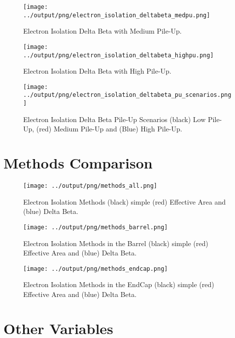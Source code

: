 \documentclass[11pt]{book}
\begin{document}
\begin{figure}[htbp]
\centering
\texttt{[image: ../output/png/electron\_isolation\_deltabeta\_medpu.png]}
\caption{Electron Isolation Delta Beta with Medium Pile-Up.}
\label{fig:electron_isolation_deltabeta_medpu}
\end{figure}

\begin{figure}[htbp]
\centering
\texttt{[image: ../output/png/electron\_isolation\_deltabeta\_highpu.png]}
\caption{Electron Isolation Delta Beta with High Pile-Up.}
\label{fig:electron_isolation_deltabeta_highpu}
\end{figure}

\begin{figure}[htbp]
\centering
\texttt{[image: ../output/png/electron\_isolation\_deltabeta\_pu\_scenarios.png]}
\caption{Electron Isolation Delta Beta Pile-Up Scenarios (black) Low Pile-Up, (red) Medium Pile-Up and (Blue) High Pile-Up.}
\label{fig:electron_isolation_deltabeta_pu_scenarios}
\end{figure}

\clearpage

\section{Methods Comparison}
\begin{figure}[ht]
\centering
\texttt{[image: ../output/png/methods\_all.png]}
\caption{Electron Isolation Methods (black) simple (red) Effective Area and (blue) Delta Beta.}
\label{fig:methods_all}
\end{figure}

\begin{figure}[ht]
\centering
\texttt{[image: ../output/png/methods\_barrel.png]}
\caption{Electron Isolation Methods in the Barrel (black) simple (red) Effective Area and (blue) Delta Beta.}
\label{fig:methods_barrel}
\end{figure}

\begin{figure}[ht]
\centering
\texttt{[image: ../output/png/methods\_endcap.png]}
\caption{Electron Isolation Methods in the EndCap (black) simple (red) Effective Area and (blue) Delta Beta.}
\label{fig:methods_endcap}
\end{figure}
\clearpage


\section{Other Variables}
\end{document}
